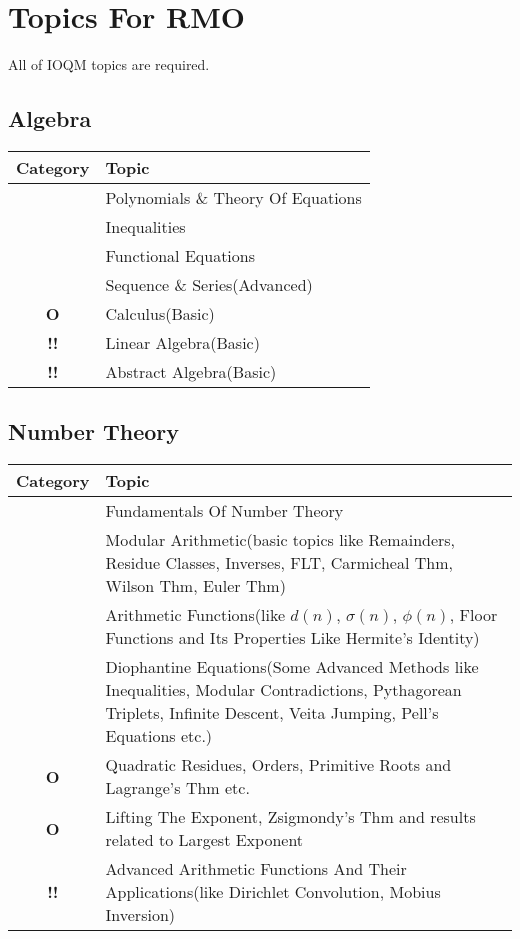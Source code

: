\documentclass[11pt]{scrartcl}
\providecommand{\isRq}{{\color{green!60!black}\CheckmarkBold}}
\providecommand{\isUs}{{\color{cyan}\sffamily\bfseries O}}
\providecommand{\isAv}{{\color{gray}\sffamily\bfseries !!}}
\begin{document}
  \section{Topics For RMO}
  All of IOQM topics are required.\\
  \subsection{Algebra}
  \begin{center}
    \begin{tabular}{cp{12cm}}
    \toprule Category & Topic \\ \midrule
    \isRq & Polynomials \& Theory Of Equations\\
    \isRq & Inequalities\\
    \isRq & Functional Equations\\
    \isRq & Sequence \& Series(Advanced)\\
    \isUs & Calculus(Basic)\\
    \isAv & Linear Algebra(Basic)\\
    \isAv & Abstract Algebra(Basic)\\
  \bottomrule
  \end{tabular}
  \end{center} 
  
  \subsection{Number Theory}
  \begin{center}
    \begin{tabular}{cp{12cm}}
    \toprule Category & Topic \\ \midrule
    \isRq & Fundamentals Of Number Theory\\
    \isRq & Modular Arithmetic(basic topics like Remainders, Residue Classes, Inverses, FLT, Carmicheal Thm, Wilson Thm, Euler Thm)\\
    \isRq & Arithmetic Functions(like $d(n)$, $\sigma(n)$, $\phi(n)$, Floor Functions and Its Properties Like Hermite's Identity)\\
    \isRq & Diophantine Equations(Some Advanced Methods like Inequalities, Modular Contradictions, Pythagorean Triplets, Infinite Descent, Veita Jumping, Pell's Equations etc.)\\
    \isUs & Quadratic Residues, Orders, Primitive Roots and Lagrange's Thm etc.\\
    \isUs & Lifting The Exponent, Zsigmondy's Thm and results related to Largest Exponent\\
    \isAv & Advanced Arithmetic Functions And Their Applications(like Dirichlet Convolution, Mobius Inversion)\\
    \bottomrule
  \end{tabular}
  \end{center}
\end{document}
